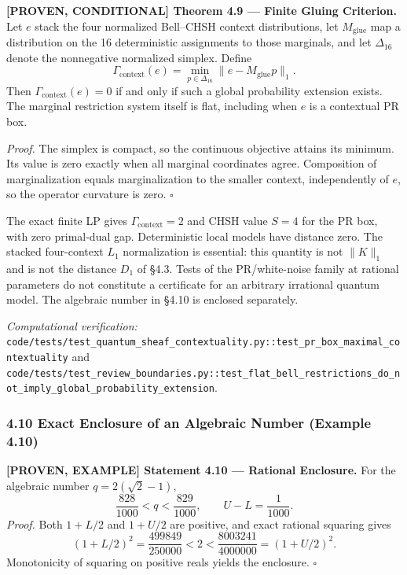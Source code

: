 \documentclass[
  english,
  10pt,
  a4paper,
]{article}
\renewenvironment{quote}
  {\begin{leftbar}\small}
  {\end{leftbar}}
\begin{document}
\begin{quote}
\textbf{{[}PROVEN, CONDITIONAL{]} Theorem 4.9 --- Finite Gluing
Criterion.} Let \(e\) stack the four normalized Bell--CHSH context
distributions, let \(M_{\mathrm{glue}}\) map a distribution on the 16
deterministic assignments to those marginals, and let \(\Delta_{16}\)
denote the nonnegative normalized simplex. Define \[
\Gamma_{\mathrm{context}}(e)=\min_{p\in\Delta_{16}}\|e-M_{\mathrm{glue}}p\|_1.
\] Then \(\Gamma_{\mathrm{context}}(e)=0\) if and only if such a global
probability extension exists. The marginal restriction system itself is
flat, including when \(e\) is a contextual PR box.

\emph{Proof.} The simplex is compact, so the continuous objective
attains its minimum. Its value is zero exactly when all marginal
coordinates agree. Composition of marginalization equals marginalization
to the smaller context, independently of \(e\), so the operator
curvature is zero. \(\square\)
\end{quote}

The exact finite LP gives \(\Gamma_{\mathrm{context}}=2\) and CHSH value
\(S=4\) for the PR box, with zero primal-dual gap. Deterministic local
models have distance zero. The stacked four-context \(L_1\)
normalization is essential: this quantity is not \(\|K\|_1\) and is not
the distance \(D_1\) of §4.3. Tests of the PR/white-noise family at
rational parameters do not constitute a certificate for an arbitrary
irrational quantum model. The algebraic number in §4.10 is enclosed
separately.

\emph{Computational verification:}
\nolinkurl{code/tests/test_quantum_sheaf_contextuality.py::test_pr_box_maximal_contextuality}
and
\nolinkurl{code/tests/test_review_boundaries.py::test_flat_bell_restrictions_do_not_imply_global_probability_extension}.

\subsubsection{4.10 Exact Enclosure of an Algebraic Number (Example
4.10)}\label{exact-enclosure-of-an-algebraic-number-example-4.10}

\begin{quote}
\textbf{{[}PROVEN, EXAMPLE{]} Statement 4.10 --- Rational Enclosure.}
For the algebraic number \(q=2(\sqrt2-1)\), \[
\frac{828}{1000}<q<\frac{829}{1000},\qquad U-L=\frac1{1000}.
\] \emph{Proof.} Both \(1+L/2\) and \(1+U/2\) are positive, and exact
rational squaring gives \[
(1+L/2)^2=\frac{499849}{250000}<2
<\frac{8003241}{4000000}=(1+U/2)^2.
\] Monotonicity of squaring on positive reals yields the enclosure.
\(\square\)
\end{quote}
\end{document}
